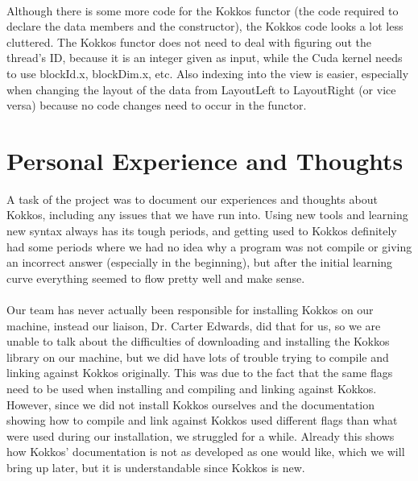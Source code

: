 \\
Although there is some more code for the Kokkos functor (the code required to declare the data members and the constructor), the Kokkos code looks a lot less cluttered. The Kokkos functor does not need to deal with figuring out the thread's ID, because it is an integer given as input, while the Cuda kernel needs to use blockId.x, blockDim.x, etc. Also indexing into the view is easier, especially when changing the layout of the data from LayoutLeft to LayoutRight (or vice versa) because no code changes need to occur in the functor.


\section{Personal Experience and Thoughts}
% 
A task of the project was to document our experiences and thoughts about Kokkos, including any issues that we have run into. Using new tools and learning new syntax always has its tough periods, and getting used to Kokkos definitely had some periods where we had no idea why a program was not compile or giving an incorrect answer (especially in the beginning), but after the initial learning curve everything seemed to flow pretty well and make sense. \\
\\
Our team has never actually been responsible for installing Kokkos on our machine, instead our liaison, Dr. Carter Edwards, did that for us, so we are unable to talk about the difficulties of downloading and installing the Kokkos library on our machine, but we did have lots of trouble trying to compile and linking against Kokkos originally. This was due to the fact that the same flags need to be used when installing and compiling and linking against Kokkos. However, since we did not install Kokkos ourselves and the documentation showing how to compile and link against Kokkos used different flags than what were used during our installation, we struggled for a while. Already this shows how Kokkos' documentation is not as developed as one would like, which we will bring up later, but it is understandable since Kokkos is new. \\
\\
